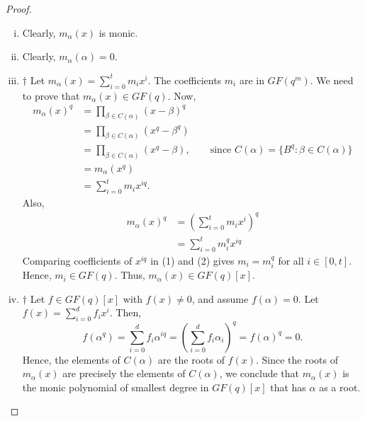 \begin{proof}
    $ \; $

    \begin{enumerate}[(i)]
        \item Clearly, $ m_\alpha(x) $ is monic.
        \item Clearly, $ m_\alpha(\alpha)=0 $.
        \item $ \dagger $ Let $ m_\alpha(x)=\sum\limits_{i=0}^{t} m_ix^i $.
        The coefficients $ m_i $ are in $ GF(q^m) $. We need to prove that
        $ m_\alpha(x)\in GF(q) $. Now,
        \begin{equation}
            \begin{aligned}
                m_\alpha(x)^q
                &=\prod_{\beta\in C(\alpha)}(x-\beta)^q\\
                &=\prod_{\beta\in C(\alpha)}(x^q-\beta^q)\\
                &=\prod_{\beta\in C(\alpha)}(x^q-\beta),\qquad \text{since }C(\alpha)=\{B^q:\beta\in C(\alpha)\}\\
                &=m_\alpha(x^q)\\
                &=\sum\limits_{i=0}^{t} m_i x^{iq}.
            \end{aligned}\tag{1}
        \end{equation}
        Also,
        \begin{equation}
            \begin{aligned}
                m_\alpha(x)^q
                &=\left( \sum\limits_{i=0}^{t} m_ix^i \right)^q\\
                &= \sum\limits_{i=0}^{t} m_i^q x^{iq}
            \end{aligned}\tag{2}
        \end{equation}
        Comparing coefficients of $ x^{iq} $ in (1) and (2) gives $ m_i=m_i^q $
        for all $ i\in[0,t] $. Hence, $ m_i\in GF(q) $. Thus, $ m_\alpha(x)\in GF(q)[x] $.
        \item $ \dagger $ Let $ f\in GF(q)[x] $ with $ f(x)\neq 0 $, and assume $ f(\alpha)=0 $.
        Let $ f(x)=\sum\limits_{i=0}^{d} f_ix^i $. Then,
        \[ f(\alpha^q)=\sum\limits_{i=0}^{d} f_i\alpha^{iq}=
        \left( \sum\limits_{i=0}^{d} f_i\alpha_i \right)^q=f(\alpha)^q=0. \]
        Hence, the elements of $ C(\alpha) $ are the roots of $ f(x) $. Since the roots
        of $ m_\alpha(x) $ are precisely the elements of $ C(\alpha) $, we conclude
        that $ m_\alpha(x) $ is the monic polynomial of smallest degree in $ GF(q)[x] $
        that has $ \alpha $ as a root.
    \end{enumerate}
\end{proof}

